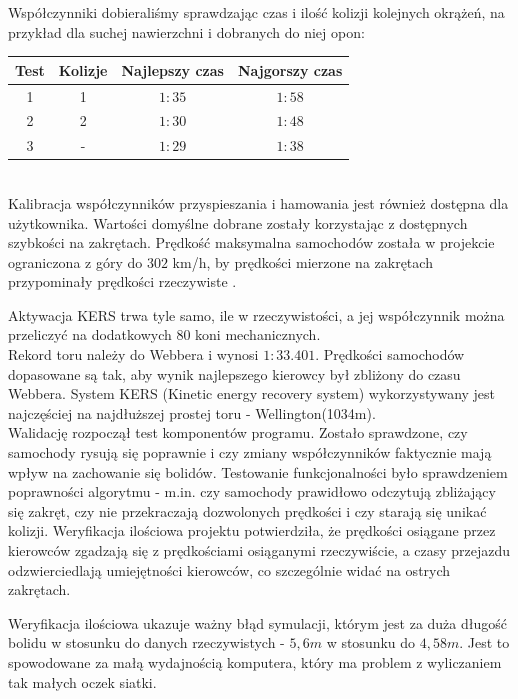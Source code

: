\documentclass{article}
\begin{document}
Współczynniki dobieraliśmy sprawdzając czas i ilość kolizji kolejnych okrążeń, na przykład dla suchej nawierzchni i dobranych do niej opon: \\

\begin{tabular}{c|c|c|c}
Test & Kolizje & Najlepszy czas & Najgorszy czas \\
\hline
1 & 1 & $1:35$ & $1:58$ \\
\hline
2 & 2 & $1:30$ & $1:48$ \\
\hline
3 & - & $1:29$ & $1:38$ \\
\end{tabular} \\

Kalibracja współczynników przyspieszania i hamowania jest również dostępna dla użytkownika. Wartości domyślne dobrane zostały korzystając z dostępnych szybkości na zakrętach. Prędkość maksymalna samochodów została w projekcie ograniczona z góry do $302$ km/h, by prędkości mierzone na zakrętach przypominały prędkości rzeczywiste \cite{fanatic}.

Aktywacja KERS trwa tyle samo, ile w rzeczywistości, a jej współczynnik można przeliczyć na dodatkowych $80$ koni mechanicznych.\\

Rekord toru należy do Webbera i wynosi $1:33.401$. Prędkości samochodów dopasowane są tak, aby wynik najlepszego kierowcy był zbliżony do czasu Webbera. System KERS (Kinetic energy recovery system) wykorzystywany jest najczęściej na najdłuższej prostej toru - Wellington(1034m). \\

Walidację rozpoczął test komponentów programu. Zostało sprawdzone, czy samochody rysują się poprawnie i czy zmiany współczynników faktycznie mają wpływ na zachowanie się bolidów. Testowanie funkcjonalności było sprawdzeniem poprawności algorytmu - m.in. czy samochody prawidłowo odczytują zbliżający się zakręt, czy nie przekraczają dozwolonych prędkości i czy starają się unikać kolizji. Weryfikacja ilościowa projektu potwierdziła, że prędkości osiągane przez kierowców zgadzają się z prędkościami osiąganymi rzeczywiście, a czasy przejazdu odzwierciedlają umiejętności kierowców, co szczególnie widać na ostrych zakrętach.

Weryfikacja ilościowa ukazuje ważny błąd symulacji, którym jest za duża długość bolidu w stosunku do danych rzeczywistych - $5,6m$ w stosunku do $4,58m$. Jest to spowodowane za małą wydajnością komputera, który ma problem z wyliczaniem tak małych oczek siatki.
\end{document}
